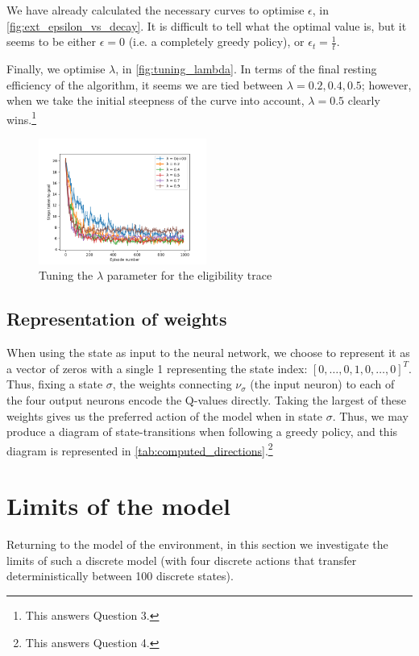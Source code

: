 \documentclass[a4paper, 11pt, twocolumn, final]{article} %
\begin{document}
We have already calculated the necessary curves to optimise $\epsilon$, in
\autoref{fig:ext_epsilon_vs_decay}.  It is difficult to tell what the optimal
value is, but it seems to be either $\epsilon = 0$ (i.e. a completely greedy
policy), or $\epsilon_t = \frac{1}{t}$.

Finally, we optimise $\lambda$, in \autoref{fig:tuning_lambda}.  In terms of the
final resting efficiency of the algorithm, it seems we are tied between $\lambda =
0.2, 0.4, 0.5$; however, when we take the initial steepness of the curve into
account, $\lambda = 0.5$ clearly wins.\footnote{This answers Question 3.}

\begin{figure}
  \includegraphics[width=0.49\textwidth]{figures/tuning_lambda.png}
  \caption{Tuning the $\lambda$ parameter for the eligibility trace}
  \label{fig:tuning_lambda}
\end{figure}

\subsection{Representation of weights} When using the state as input to the
neural network, we choose to represent it as a vector of zeros with a single 1
representing the state index: $[0, \ldots, 0, 1, 0, \ldots, 0]^T$.  Thus, fixing
a state $\sigma$, the weights connecting $\nu_\sigma$ (the input neuron) to each
of the four output neurons encode the Q-values directly.  Taking the largest of
these weights gives us the preferred action of the model when in state $\sigma$.
Thus, we may produce a diagram of state-transitions when following a greedy
policy, and this diagram is represented in
\autoref{tab:computed_directions}.\footnote{This answers Question 4.}

\section{Limits of the model} Returning to the model of the environment, in this
section we investigate the limits of such a discrete model (with four discrete
actions that transfer deterministically between 100 discrete states).
\end{document}
